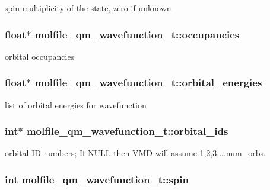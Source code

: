 spin multiplicity of the state, zero if unknown \hypertarget{structmolfile__qm__wavefunction__t_a3926a131683e99ca76de85c03ddab067}{
\subsubsection[{occupancies}]{\setlength{\rightskip}{0pt plus 5cm}float$\ast$ {\bf molfile\-\_\-qm\-\_\-wavefunction\-\_\-t\-::occupancies}}}\label{structmolfile__qm__wavefunction__t_a3926a131683e99ca76de85c03ddab067}
orbital occupancies \hypertarget{structmolfile__qm__wavefunction__t_acfd90a529cee8eee694388861dea3e96}{
\subsubsection[{orbital\-\_\-energies}]{\setlength{\rightskip}{0pt plus 5cm}float$\ast$ {\bf molfile\-\_\-qm\-\_\-wavefunction\-\_\-t\-::orbital\-\_\-energies}}}\label{structmolfile__qm__wavefunction__t_acfd90a529cee8eee694388861dea3e96}
list of orbital energies for wavefunction \hypertarget{structmolfile__qm__wavefunction__t_aef010c47af4d38b9d6dad535f4b2afd2}{
\subsubsection[{orbital\-\_\-ids}]{\setlength{\rightskip}{0pt plus 5cm}int$\ast$ {\bf molfile\-\_\-qm\-\_\-wavefunction\-\_\-t\-::orbital\-\_\-ids}}}\label{structmolfile__qm__wavefunction__t_aef010c47af4d38b9d6dad535f4b2afd2}
orbital \-I\-D numbers; \-If \-N\-U\-L\-L then \-V\-M\-D will assume 1,2,3,...num\-\_\-orbs. \hypertarget{structmolfile__qm__wavefunction__t_a9e9922bb35f3b103fdbcac7da63827f5}{
\subsubsection[{spin}]{\setlength{\rightskip}{0pt plus 5cm}int {\bf molfile\-\_\-qm\-\_\-wavefunction\-\_\-t\-::spin}}}\label{structmolfile__qm__wavefunction__t_a9e9922bb35f3b103fdbcac7da63827f5}
